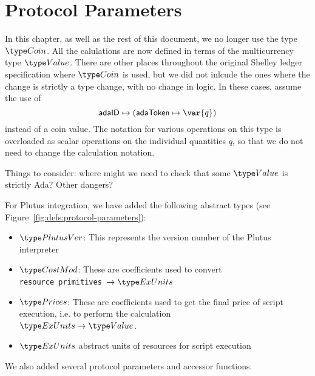 \section{Protocol Parameters}
\label{sec:protocol-parameters}

\begin{note}
  In this chapter, as well as the rest of this document, we no longer use the type $\Coin$.
  All the calulations are now defined in terms of the multicurrency type $\Value$.
  There are other places throughout the original Shelley ledger specification where
  $\Coin$ is used, but we did not inlcude the ones where the change is strictly a type
  change, with no change in logic. In these cases, assume the use of
  \[\mathsf{adaID} \mapsto (\mathsf{adaToken} \mapsto \var{q})\]
  instead of a coin value. The notation for various operations on this type
  is overloaded as scalar operations on the individual quantities $q$, so that
  we do not need to change the calculation notation.

  Things to consider: where might we need to check that some $\Value$ is strictly
  Ada? Other dangers?
\end{note}

For Plutus integration, we have added the following abstract types
(see Figure~\ref{fig:defs:protocol-parameters}):

\begin{itemize}
\item $\PlutusVer$: This represents the version number of the Plutus interpreter
\item $\CostMod$: These are coefficients used to convert \\
\texttt{resource primitives}~$\to \ExUnits$
\item $\Prices$: These are coefficients used to get the final price of script
execution, i.e. to perform the calculation \\
$\ExUnits \to \Value$.
\item $\ExUnits$ abstract units of resources for script execution
\end{itemize}

We also added several protocol parameters and accessor functions.


